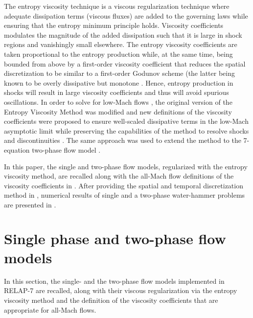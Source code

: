 \documentclass{mc2015}
\begin{document}
The entropy viscosity technique is a viscous regularization technique where adequate dissipation terms (viscous fluxes) are added to the governing laws while ensuring 
that the entropy minimum principle holds. Viscosity coefficients modulates the magnitude of the added dissipation such that it is large in shock regions and vanishingly 
small elsewhere. The entropy viscosity coefficients are taken proportional to the entropy production while, at the same time, being bounded from above by a first-order 
viscosity coefficient that reduces the spatial discretization to be similar to a first-order Godunov scheme (the latter being known to be overly dissipative but monotone 
\cite{Toro}. Hence, entropy production in shocks will result in large viscosity coefficients and thus will avoid spurious oscillations. In order to solve for 
low-Mach flows \cite{LowMach1, LowMach2, LowMach3}, the original version of the Entropy Viscosity Method was modified and new definitions of the viscosity coefficients 
were proposed to ensure well-scaled dissipative terms in the low-Mach asymptotic limit while preserving the capabilities of the method to resolve shocks and discontinuities 
\cite{Marco_dissertation, Marco_paper_low_mach}. The same approach was used to extend the method to the 7-equation two-phase flow model 
\cite{Marco_paper_7_equ, Marco_dissertation}. 

In this paper, the single and two-phase flow models, regularized with the entropy viscosity method, are recalled along with the all-Mach flow definitions of the viscosity coefficients 
in . After providing the spatial and temporal discretization method in , numerical results of single and a two-phase water-hammer problems are 
presented in . 

%
\section{Single phase and two-phase flow models}\label{sct:model}
%
In this section, the single- and the two-phase flow models implemented in RELAP-7 are recalled, along with their viscous regularization via the entropy viscosity method 
and the definition of the viscosity coefficients that are appropriate for all-Mach flows. %
%
\end{document}
